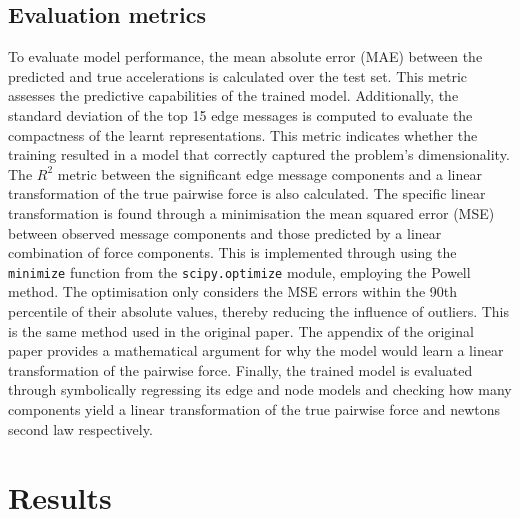 \documentclass[11pt]{article}
\begin{document}
\subsection{Evaluation metrics}
To evaluate model performance, the mean absolute error (MAE) between the predicted and true accelerations is calculated over the test set. This metric assesses the predictive capabilities of the trained model. Additionally, the standard deviation of the top 15 edge messages is computed to evaluate the compactness of the learnt representations. This metric indicates whether the training resulted in a model that correctly captured the problem's dimensionality. The $R^2$ metric between the significant edge message components and a linear transformation of the true pairwise force is also calculated. The specific linear transformation is found through a minimisation the mean squared error (MSE) between observed message components and those predicted by a linear combination of force components. This is implemented through using the \texttt{minimize} function from the \texttt{scipy.optimize} module, employing the Powell method. The optimisation only considers the MSE errors within the 90th percentile of their absolute values, thereby reducing the influence of outliers. This is the same method used in the original paper. The appendix of the original paper provides a mathematical argument for why the model would learn a linear transformation of the pairwise force. Finally, the trained model is evaluated through symbolically regressing its edge and node models and checking how many components yield a linear transformation of the true pairwise force and newtons second law respectively.

\section{Results}
\end{document}
